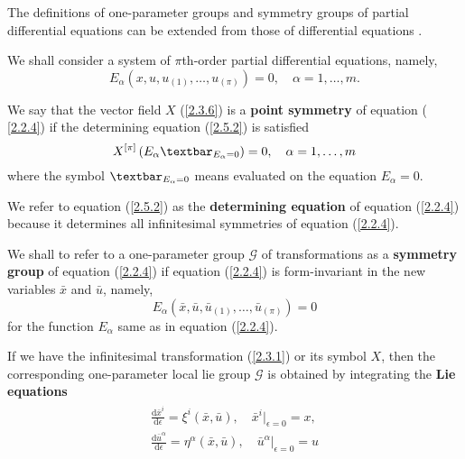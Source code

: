 \begin{rem}The definitions of one-parameter groups and symmetry groups of partial differential equations can be extended from those of differential equations \citep*{ibragimov2009practical}.
\end{rem} 
We shall consider a system of  $ \pi$th-order partial differential equations, namely,
\begin{equation}
E_{\alpha}( x, u , u_{(1)}, \ldots,u_{(\pi)}) =0, \quad \alpha = 1,  \ldots, m. \label{2.2.4}
\end{equation}

\begin{defn} We say that the vector field $X$ (\ref{2.3.6}) is  a \textbf{point symmetry} of equation ( \ref{2.2.4}) if the determining equation (\ref{2.5.2}) is satisfied
	\begin{equation}
	X^{[\pi]} \left(  E_{ \alpha } \textbar_{ E_{ \alpha }=0 } \right)= 0, \quad \alpha=1,\ldots,m \label{2.5.2}
	\end{equation}	where the symbol $\textbar_{E_{ \alpha }=0}$ means evaluated on the equation $ E_{\alpha} =0$.
\end{defn}
\begin{rem}We refer to  equation (\ref{2.5.2}) as  the \textbf{determining equation} of equation (\ref{2.2.4}) because it determines all infinitesimal symmetries of equation (\ref{2.2.4}).
\end{rem}

\begin{defn}We shall to refer to a  one-parameter group $\mathcal{G}$ of transformations as a \textbf{symmetry group} of equation (\ref{2.2.4}) if equation (\ref{2.2.4}) is form-invariant in the new variables $ \bar{x}$ and $ \bar{u}$, namely,
	\begin{equation} E_{\alpha}( \bar{x}, \bar{u} , \bar{u}_{(1)}, \ldots, \bar{u}_{(\pi)})=0 
	\label{2.5.3}
	\end{equation} for the function $ E_{\alpha}$  same as in equation (\ref{2.2.4}).	
\end{defn}
\begin{thm} If we have the infinitesimal  transformation (\ref{2.3.1})  or its symbol $X$, then the corresponding one-parameter local lie group  $\mathcal{G}$ is obtained by integrating the \textbf{Lie equations }
	\begin{align}
	\begin{aligned}
	\frac{ \mathrm{d} \bar{x}^i}{ \mathrm{d} \epsilon } = \xi^i(\bar{x}, \bar{u} ), \quad  \bar{x}^i|_{\epsilon=0} = x,\\
	\frac{ \mathrm{d}  \bar{u}^{\alpha} }{ \mathrm{d} \epsilon } = \eta^{\alpha}(\bar{x}, \bar{u} ), \quad \bar{u}^{\alpha} |_{ \epsilon=0} = u
	\end{aligned}
	\end{align} 	
\end{thm}





